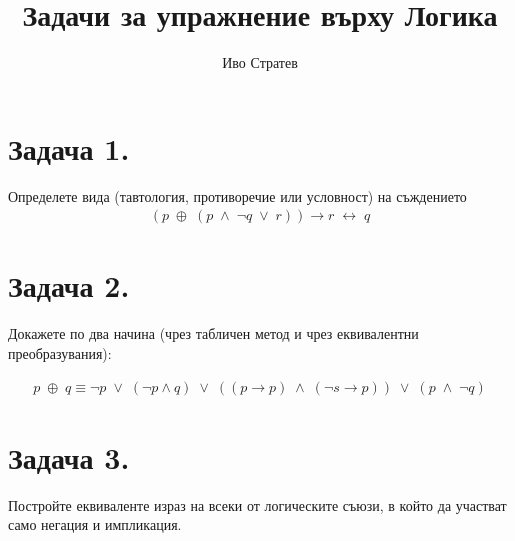 \documentclass[12pt]{article}
\title{Задачи за упражнение върху Логика}
\author{Иво Стратев}
\begin{document}
\maketitle

\section*{Задача 1.}

Определете вида (тавтология, противоречие или условност) на съждението
\begin{align*}
(p \; \oplus \; (p \; \land \; \neg q \; \lor \;  r)) \to r \; \leftrightarrow \; q
\end{align*}

\section*{Задача 2.}
Докажете по два начина (чрез табличен метод и чрез еквивалентни преобразувания):

\begin{align*}
p \; \oplus \; q \equiv \neg p \; \lor \; (\neg p \land q) \; \lor \; ((p \to p) \; \land \; (\neg s \to p)) \; \lor \; (p \; \land \; \neg q)
\end{align*}

\section*{Задача 3.}

Постройте еквиваленте израз на всеки от логическите съюзи, в който да участват само негация и импликация.
\end{document}
